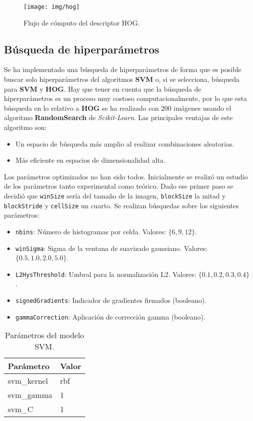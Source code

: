 \documentclass[12pt,letterpaper]{article}
\begin{document}
\begin{figure}[htp]
    \centering
    \texttt{[image: img/hog]}
    \caption{Flujo de cómputo del descriptor HOG.}
    \label{fig:hog}
\end{figure}

\subsection{Búsqueda de hiperparámetros}
Se ha implementado una búsqueda de hiperparámetros de forma que es posible buscar solo hiperparámetros del algoritmos \textbf{SVM} o, si se selecciona, búsqueda para \textbf{SVM} y \textbf{HOG}. Hay que tener en cuenta que la búsqueda de hiperparámetros es un proceso muy costoso computacionalmente, por lo que esta búsqueda en lo relativo a \textbf{HOG} se ha realizado con $200$ imágenes usando el algoritmo \textbf{RandomSearch} de \textit{Scikit-Learn}. Las principales ventajas de este algoritmo son:
\begin{itemize}
    \item Un espacio de búsqueda más amplio al realizar combinaciones aleatorias.
    \item Más eficiente en espacios de dimensionalidad alta.
\end{itemize}
Los parámetros optimizados no han sido todos. Inicialmente se realizó un estudio de los parámetros tanto experimental como teórico. Dado ese primer paso se decidió que \texttt{winSize} sería del tamaño de la imagen, \texttt{blockSize} la mitad y \texttt{blockStride} y \texttt{cellSize} un cuarto. Se realizan búsquedas sobre los siguientes parámetros:

\begin{itemize}
    \item \texttt{nbins}: Número de histogramas por celda. Valores: $\{6, 9, 12\}$.
    \item \texttt{winSigma}: Sigma de la ventana de suavizado gaussiano. Valores: $\{0.5, 1.0, 2.0, 5.0\}$.
    \item \texttt{L2HysThreshold}: Umbral para la normalización L2. Valores: $\{0.1, 0.2, 0.3, 0.4\}$.
    \item \texttt{signedGradients}: Indicador de gradientes firmados (booleano).
    \item \texttt{gammaCorrection}: Aplicación de corrección gamma (booleano).
\end{itemize}

\begin{table}[htp]
    \centering
    \begin{tabular}{ll}
    \hline
    \textbf{Parámetro} & \textbf{Valor} \\
    \hline
    svm\_kernel & rbf \\
    svm\_gamma & 1 \\
    svm\_C & 1 \\
    \hline
    \end{tabular}
    \caption{Parámetros del modelo SVM.}
    \label{tab:svm_params}
\end{table}
\end{document}
